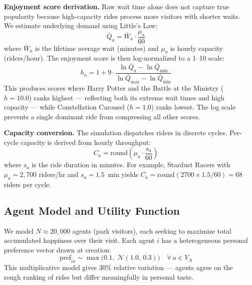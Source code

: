 \documentclass[11pt]{article}
\begin{document}
\textbf{Enjoyment score derivation.} Raw wait time alone does not capture true popularity because high-capacity rides process more visitors with shorter waits. We estimate underlying demand using Little's Law:
\[
\bar{Q}_a = \bar{W}_a \cdot \frac{\mu_a}{60}
\]
where $\bar{W}_a$ is the lifetime average wait (minutes) and $\mu_a$ is hourly capacity (riders/hour). The enjoyment score is then log-normalized to a 1--10 scale:
\[
h_a = 1 + 9 \cdot \frac{\ln \bar{Q}_a - \ln \bar{Q}_{\min}}{\ln \bar{Q}_{\max} - \ln \bar{Q}_{\min}}
\]
This produces scores where Harry Potter and the Battle at the Ministry ($h = 10.0$) ranks highest --- reflecting both its extreme wait times and high capacity --- while Constellation Carousel ($h = 1.0$) ranks lowest. The log scale prevents a single dominant ride from compressing all other scores.

\textbf{Capacity conversion.} The simulation dispatches riders in discrete cycles. Per-cycle capacity is derived from hourly throughput:
\[
C_a = \text{round}\!\left(\mu_a \cdot \frac{s_a}{60}\right)
\]
where $s_a$ is the ride duration in minutes. For example, Stardust Racers with $\mu_a = 2{,}700$ riders/hr and $s_a = 1.5$~min yields $C_a = \text{round}(2700 \times 1.5 / 60) = 68$ riders per cycle.

\subsection{Agent Model and Utility Function}

We model $N \approx 20{,}000$ agents (park visitors), each seeking to maximize total accumulated happiness over their visit. Each agent $i$ has a heterogeneous personal preference vector drawn at creation:
\[
\text{pref}_{ia} \sim \max\!\big(0.1,\; \mathcal{N}(1.0,\, 0.3)\big) \quad \forall\, a \in V_A
\]
This multiplicative model gives 30\% relative variation --- agents agree on the rough ranking of rides but differ meaningfully in personal taste.
\end{document}
